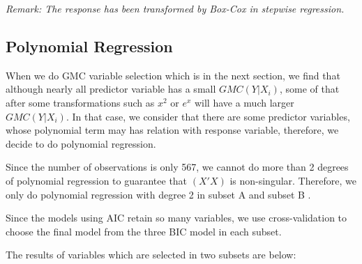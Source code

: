 \documentclass[conference,letterpaper]{IEEEtran}
\begin{document}

     \emph {Remark: The response has been transformed by Box-Cox in stepwise regression. }



\subsection{{\fontsize{11}{13}\selectfont Polynomial Regression}}
{\fontsize{11}{13}\selectfont When we do GMC variable selection which is in the next section, we find that although nearly all predictor variable has a small $GMC(Y|X_i)$, some of that after some transformations such as $x^2$ or $e^x$ will have a much larger $GMC(Y|X_i)$. In that case, we consider that there are some predictor variables, whose polynomial term may has relation with response variable, therefore, we decide to do polynomial regression. 

Since the number of observations is only 567, we cannot do more than 2 degrees of polynomial regression to guarantee that $(X'X)$ is non-singular. Therefore, we only do polynomial regression with degree 2 in subset A and subset B .

Since the models using AIC retain so many variables, we use cross-validation to choose the final model from the three BIC model in each subset. 

The results of variables which are selected in two subsets are below:
}

\end{document}
